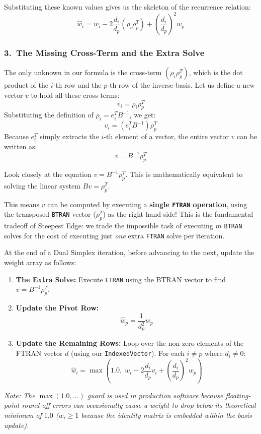 \documentclass[11pt, a4paper]{article}
\begin{document}
Substituting these known values gives us the skeleton of the recurrence relation:
\[
\hat{w}_i = w_i - 2 \frac{d_i}{d_p} (\rho_i \rho_p^T) + \left(\frac{d_i}{d_p}\right)^2 w_p
\]

\subsubsection*{3.\ The Missing Cross-Term and the Extra Solve}

The only unknown in our formula is the cross-term $(\rho_i \rho_p^T)$, which is the dot product of the $i$-th row and the $p$-th row of the inverse basis. Let us define a new vector $v$ to hold all these cross-terms:
\[
v_i = \rho_i \rho_p^T
\]
Substituting the definition of $\rho_i = e_i^T B^{-1}$, we get:
\[
v_i = (e_i^T B^{-1}) \rho_p^T
\]
Because $e_i^T$ simply extracts the $i$-th element of a vector, the entire vector $v$ can be written as:
\[
v = B^{-1} \rho_p^T
\]

\begin{note}
Look closely at the equation $v = B^{-1} \rho_p^T$. This is mathematically equivalent to solving the linear system $B v = \rho_p^T$. 

This means $v$ can be computed by executing a \textbf{single \texttt{FTRAN} operation}, using the transposed \texttt{BTRAN} vector ($\rho_p^T$) as the right-hand side! This is the fundamental tradeoff of Steepest Edge: we trade the impossible task of executing $m$ \texttt{BTRAN} solves for the cost of executing just \emph{one} extra \texttt{FTRAN} solve per iteration.
\end{note}

\begin{algostep}
At the end of a Dual Simplex iteration, before advancing to the next, update the weight array as follows:
\begin{enumerate}[label=\textbf{\arabic*.}, leftmargin=*, itemsep=2pt]
    \item \textbf{The Extra Solve:} Execute \texttt{FTRAN} using the BTRAN vector to find $v = B^{-1} \rho_p^T$.
    \item \textbf{Update the Pivot Row:} 
          \[ \hat{w}_p = \frac{1}{d_p^2} w_p \]
    \item \textbf{Update the Remaining Rows:} Loop over the non-zero elements of the FTRAN vector $d$ (using our \texttt{IndexedVector}). For each $i \neq p$ where $d_i \neq 0$:
          \[ \hat{w}_i = \max\left(1.0, \; w_i - 2 \frac{d_i}{d_p} v_i + \left(\frac{d_i}{d_p}\right)^2 w_p \right) \]
\end{enumerate}
\emph{Note: The $\max(1.0, \dots)$ guard is used in production software because floating-point round-off errors can occasionally cause a weight to drop below its theoretical minimum of $1.0$ ($w_i \ge 1$ because the identity matrix is embedded within the basis update).}
\end{algostep}
\end{document}
